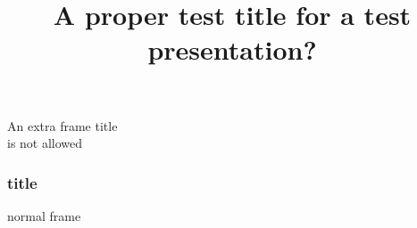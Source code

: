 \documentclass{beamer}
\title{A proper test title for a test presentation?}
\begin{document}
\begin{frame}{An extra frame title\\[2ex] is not allowed}
    \titlepage
\end{frame}

\begin{frame}
\frametitle{title}
normal frame
\end{frame}
\end{document}
